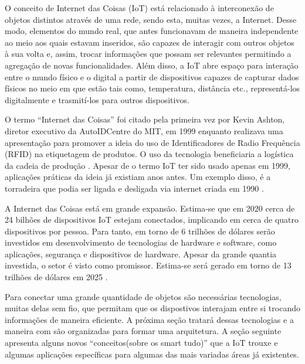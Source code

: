 \documentclass[
	article,			%
	11pt,				%
	oneside,			%
	a4paper,			%
	section=TITLE,		%
	subsection=TITLE,	%
	english,			%
	brazil,				%
	sumario=tradicional
	]{abntex2}
\begin{document}

O conceito de Internet das Coisas (IoT) está relacionado à interconexão de objetos distintos 
através de uma rede, sendo esta, muitas vezes, a Internet. Desse modo, elementos do mundo real, que 
antes funcionavam de maneira independente ao meio aos quais estavam inseridos, são capazes de 
interagir com outros objetos à sua volta e, assim, trocar informações que possam ser relevantes 
permitindo a agregação de novas funcionalidades.  Além disso, a IoT abre espaço para interação 
entre o mundo físico e o digital a partir de dispositivos capazes de capturar dados físicos no meio 
em que estão tais como, temperatura, distância etc., representá-los digitalmente e trasmití-los 
para outros dispositivos.

	
O termo ``Internet das Coisas'' foi citado pela primeira vez por Kevin Ashton, diretor executivo da 
AutoIDCentre do MIT, em 1999 enquanto realizava uma apresentação para promover a ideia do uso de 
Identificadores de Radio Frequência (RFID) na etiquetagem de produtos. O uso da tecnologia 
beneficiaria a logística da cadeia de produção \cite{kevin-ashton}. Apesar de o termo IoT ter sido 
usado apenas em 1999, aplicações práticas da ideia já existiam anos antes. Um exemplo disso, é a 
torradeira que podia ser ligada e desligada via internet criada em 1990 \cite{survey-suresh}.




A Internet das Coisas está em grande expansão. Estima-se que em 2020 cerca de 24 bilhões de 
dispositivos IoT estejam conectados, implicando em cerca de quatro dispositivos por pessoa. Para 
tanto, em torno de 6 trilhões de dólares serão investidos em desenvolvimento de tecnologias de 
hardware e software, como aplicações, segurança e dispositivos de hardware. Apesar da grande 
quantia investida, o setor é visto como promissor. Estima-se será gerado em torno de 13 trilhões de 
dólares 
em 2025 \cite{andrewmeola2016}. 

Para conectar uma grande quantidade de objetos são necessárias tecnologias, muitas delas sem fio, 
que permitam que os dispostivos interajam entre si trocando informações de maneira eficiente. A 
próxima seção tratará dessas tecnologias e a maneira com são organizadas para formar uma 
arquitetura. A seção seguinte apresenta alguns novos ``conceitos(sobre os smart tudo)'' que a IoT 
trouxe e algumas aplicações específicas para algumas das mais variadas áreas já existentes.
\end{document}
